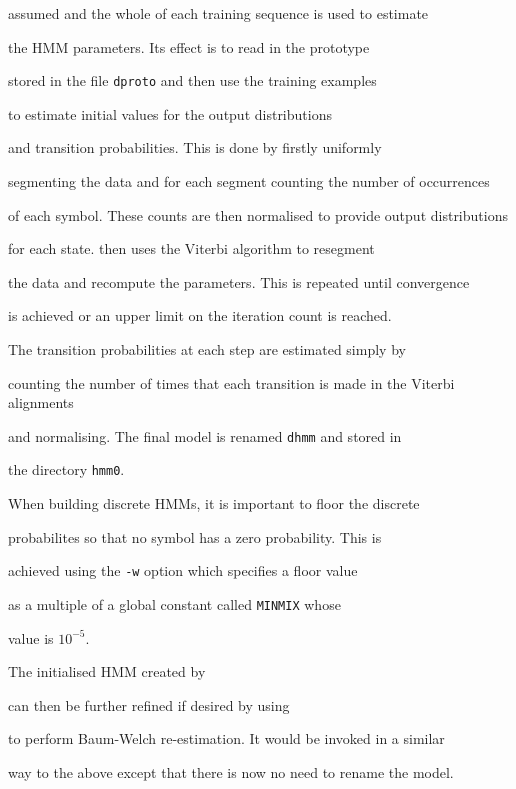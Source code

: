 assumed and the whole of each training sequence is used to estimate


the HMM parameters.  Its effect is to read in the prototype


stored in the file \texttt{dproto} and then use the training examples


to estimate initial values for the output distributions


and transition probabilities.  This is done by firstly uniformly 


segmenting the data and for each segment counting the number of occurrences


of each symbol.  These counts are then normalised to provide output distributions


for each state.   then uses the Viterbi algorithm to resegment


the data and recompute the parameters.  This is repeated until convergence


is achieved or an upper limit on the iteration count is reached.


The transition probabilities at each step are estimated simply by


counting the number of times that each transition is made in the Viterbi alignments


and normalising.  The final model is renamed \texttt{dhmm} and stored in


the directory \texttt{hmm0}.





When building discrete HMMs, it is important to floor the discrete


probabilites so that no symbol has a zero probability.  This is 


achieved using the \texttt{-w} option which specifies a floor value


as a multiple of a global constant called \texttt{MINMIX} whose


value is $10^{-5}$. 





The initialised HMM created by  


can then be further refined if desired by using 


to perform Baum-Welch re-estimation.  It would be invoked in a similar


way to the above except that there is now no need to rename the model.


